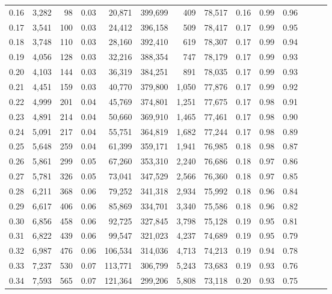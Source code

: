 \begin{tabular}{rrrrrrrrrrrrrr}
0.16 &  3,282 &     98 &  0.03 &   20,871 &  399,699 &     409 &  78,517 &  0.16 &  0.99 &      0.96 \\
0.17 &  3,541 &    100 &  0.03 &   24,412 &  396,158 &     509 &  78,417 &  0.17 &  0.99 &      0.95 \\
0.18 &  3,748 &    110 &  0.03 &   28,160 &  392,410 &     619 &  78,307 &  0.17 &  0.99 &      0.94 \\
0.19 &  4,056 &    128 &  0.03 &   32,216 &  388,354 &     747 &  78,179 &  0.17 &  0.99 &      0.93 \\
0.20 &  4,103 &    144 &  0.03 &   36,319 &  384,251 &     891 &  78,035 &  0.17 &  0.99 &      0.93 \\
0.21 &  4,451 &    159 &  0.03 &   40,770 &  379,800 &   1,050 &  77,876 &  0.17 &  0.99 &      0.92 \\
0.22 &  4,999 &    201 &  0.04 &   45,769 &  374,801 &   1,251 &  77,675 &  0.17 &  0.98 &      0.91 \\
0.23 &  4,891 &    214 &  0.04 &   50,660 &  369,910 &   1,465 &  77,461 &  0.17 &  0.98 &      0.90 \\
0.24 &  5,091 &    217 &  0.04 &   55,751 &  364,819 &   1,682 &  77,244 &  0.17 &  0.98 &      0.89 \\
0.25 &  5,648 &    259 &  0.04 &   61,399 &  359,171 &   1,941 &  76,985 &  0.18 &  0.98 &      0.87 \\
0.26 &  5,861 &    299 &  0.05 &   67,260 &  353,310 &   2,240 &  76,686 &  0.18 &  0.97 &      0.86 \\
0.27 &  5,781 &    326 &  0.05 &   73,041 &  347,529 &   2,566 &  76,360 &  0.18 &  0.97 &      0.85 \\
0.28 &  6,211 &    368 &  0.06 &   79,252 &  341,318 &   2,934 &  75,992 &  0.18 &  0.96 &      0.84 \\
0.29 &  6,617 &    406 &  0.06 &   85,869 &  334,701 &   3,340 &  75,586 &  0.18 &  0.96 &      0.82 \\
0.30 &  6,856 &    458 &  0.06 &   92,725 &  327,845 &   3,798 &  75,128 &  0.19 &  0.95 &      0.81 \\
0.31 &  6,822 &    439 &  0.06 &   99,547 &  321,023 &   4,237 &  74,689 &  0.19 &  0.95 &      0.79 \\
0.32 &  6,987 &    476 &  0.06 &  106,534 &  314,036 &   4,713 &  74,213 &  0.19 &  0.94 &      0.78 \\
0.33 &  7,237 &    530 &  0.07 &  113,771 &  306,799 &   5,243 &  73,683 &  0.19 &  0.93 &      0.76 \\
0.34 &  7,593 &    565 &  0.07 &  121,364 &  299,206 &   5,808 &  73,118 &  0.20 &  0.93 &      0.75 \\

\end{tabular}
